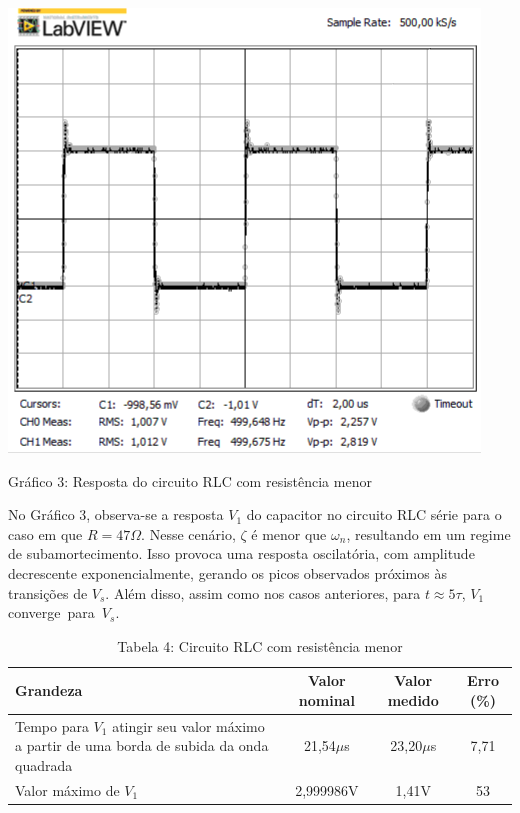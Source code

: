 \documentclass[a4 paper]{article}
\begin{document}
\newpage
\begin{table}[h]
\centering
\includegraphics[scale=0.6]{rgadicoas/rgadicoa3}
\end{table}

\begin{center}
Gráfico 3: Resposta do circuito RLC com resistência menor
\end{center}





No Gráfico 3, observa-se a resposta $V_1$ do capacitor no circuito RLC série para o caso em que $R=47\Omega$. Nesse cenário, $\zeta$ é menor que $\omega_n$, resultando em um regime de subamortecimento. Isso provoca uma resposta oscilatória, com amplitude decrescente exponencialmente, gerando os picos observados próximos às transições de $V_s$. Além disso, assim como nos casos anteriores, para $t\approx5\tau$, $V_1$ converge para $V_s.$







\vspace{5pt}
\begin{table}[hb]
\centering
\begin{tabular}{|p{5cm}|c|c|c|}
\hline
Grandeza & Valor nominal & Valor medido & Erro (\%) \\\hline
Tempo para $V_1$ atingir seu valor máximo a partir de uma borda de subida da onda quadrada & 21,54$\mu$s & 23,20$\mu$s &7,71 \\    \hline
\centering Valor máximo de $V_1$ & 2,999986V & 1,41V & 53\\    \hline
\end{tabular}
\caption*{Tabela 4: Circuito RLC com resistência menor}
\end{table}
\end{document}
